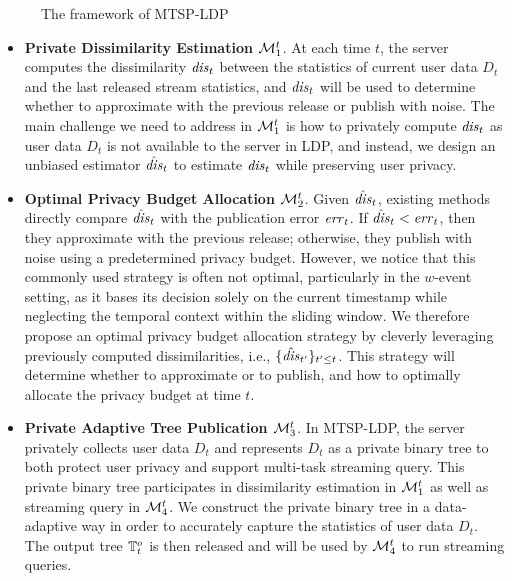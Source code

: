 \begin{figure}[htp]
  \centering
  
  \caption{The framework of MTSP-LDP}
  \label{fig:framework}
\end{figure}
\begin{itemize}
\item {\textbf{Private Dissimilarity Estimation $\mathcal{M}_1^t$}}.
At each time $t$, the server computes the dissimilarity $\mathit{dis}_t$ between the
statistics of current user data $D_t$ and the last released stream statistics,
and $\mathit{dis}_t$ will be used to determine whether to approximate with the previous
release or publish with noise.
The main challenge we need to address in $\mathcal{M}_1^t$ is how to privately compute
$\mathit{dis}_t$ as user data $D_t$ is not available to the server in LDP, and instead,
we design an unbiased estimator $\hat{\mathit{dis}}_t$ to estimate $\mathit{dis}_t$ while preserving
user privacy.
\item {\textbf{Optimal Privacy Budget Allocation $\mathcal{M}_2^t$}}.
Given $\hat{\mathit{dis}}_t$, existing methods~\cite{Kellaris2014,Ren2022} directly compare
$\hat{\mathit{dis}}_t$ with the publication error $\mathit{err}_t$. If $\hat{\mathit{dis}}_t < \mathit{err}_t$, then they
approximate with the previous release; otherwise, they publish with noise using a
predetermined privacy budget.
However, we notice that this commonly used strategy is often not optimal,
particularly in the $w$-event setting, as it bases its decision solely on the
current timestamp while neglecting the temporal context within the sliding window.
We therefore propose an optimal privacy budget allocation strategy by cleverly leveraging
previously computed dissimilarities, i.e., $\{\hat{\mathit{dis}}_{t'}\}_{t'\leq t}$.
This strategy will determine whether to approximate or to publish, and how to
optimally allocate the privacy budget at time $t$.

\item {\textbf{Private Adaptive Tree Publication $\mathcal{M}_3^t$}}.
In MTSP-LDP, the server privately collects user data $D_t$ and represents $D_t$
as a private binary tree to both protect user privacy and support
multi-task streaming query.
This private binary tree participates in dissimilarity estimation in
$\mathcal{M}_1^t$ as well as streaming query in $\mathcal{M}_4^t$.
We construct the private binary tree in a data-adaptive way in order to
accurately capture the statistics of user data $D_t$.
The output tree $\mathbb{T}^o_t$ is then released and will be used by $\mathcal{M}_4^t$ to run
streaming queries.


\end{itemize}
